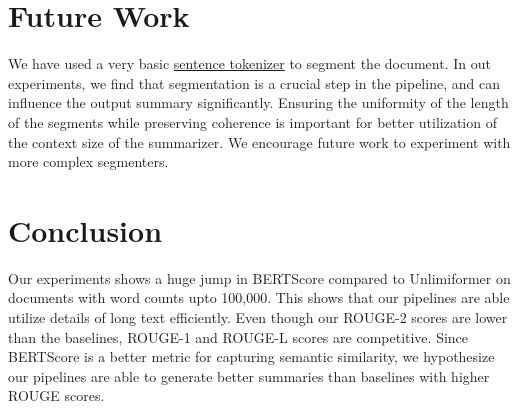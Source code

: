 \section{Future Work}

We have used a very basic
\href{https://www.nltk.org/api/nltk.tokenize.sent_tokenize.html}{sentence tokenizer} to
segment the document.
In out experiments, we find that segmentation is a crucial step in the pipeline, and can
influence the output summary significantly.
Ensuring the uniformity of the length of the segments while preserving coherence is
important for better utilization of the context size of the summarizer.
We encourage future work to experiment with more complex segmenters.


\section{Conclusion}
\label{sec:conclusion}

Our experiments shows a huge jump in BERTScore compared to Unlimiformer on
documents with word counts upto 100,000.
This shows that our pipelines are able utilize details of long text efficiently.
Even though our ROUGE-2 scores are lower than the baselines, ROUGE-1 and ROUGE-L
scores are competitive.
Since BERTScore is a better metric for capturing semantic similarity, we hypothesize
our pipelines are able to generate better summaries than baselines with higher
ROUGE scores.
